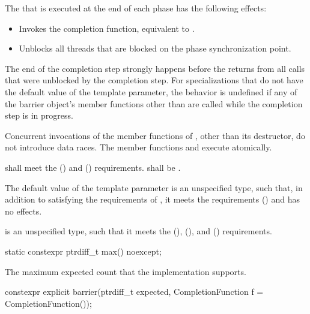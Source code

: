 \pnum
The 
that is executed at the end of each phase has the following effects:
\begin{itemize}
\item Invokes the completion function, equivalent to .
\item Unblocks all threads that are blocked on the phase synchronization point.
\end{itemize}
The end of the completion step strongly happens before
the returns from all calls that were unblocked by the completion step.
For specializations that do not have
the default value of the  template parameter,
the behavior is undefined if any of the barrier object's member functions
other than  are called while the completion step is in progress.

\pnum
Concurrent invocations of the member functions of ,
other than its destructor, do not introduce data races.
The member functions  and 
execute atomically.

\pnum
{} shall meet the
 () and
 () requirements.
 shall be .

\pnum
The default value of the  template parameter is
an unspecified type, such that,
in addition to satisfying the requirements of ,
it meets the 
requirements () and
 has no effects.

\pnum
{} is an unspecified type,
such that it meets the
 (),
 (), and
 () requirements.

%
\begin{itemdecl}
static constexpr ptrdiff_t max() noexcept;
\end{itemdecl}

\begin{itemdescr}
\pnum
\returns
The maximum expected count that the implementation supports.
\end{itemdescr}

\begin{itemdecl}
constexpr explicit barrier(ptrdiff_t expected,
                           CompletionFunction f = CompletionFunction());
\end{itemdecl}


